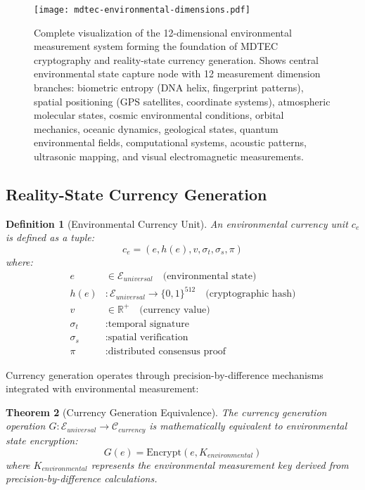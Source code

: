 \documentclass[12pt,a4paper]{article}
\newtheorem{theorem}{Theorem}
\newtheorem{definition}[theorem]{Definition}
\begin{document}
\begin{figure}[H]
\centering
\texttt{[image: mdtec-environmental-dimensions.pdf]}
\caption{Complete visualization of the 12-dimensional environmental measurement system forming the foundation of MDTEC cryptography and reality-state currency generation. Shows central environmental state capture node with 12 measurement dimension branches: biometric entropy (DNA helix, fingerprint patterns), spatial positioning (GPS satellites, coordinate systems), atmospheric molecular states, cosmic environmental conditions, orbital mechanics, oceanic dynamics, geological states, quantum environmental fields, computational systems, acoustic patterns, ultrasonic mapping, and visual electromagnetic measurements.}
\label{fig:environmental_dimensions}
\end{figure}

\subsection{Reality-State Currency Generation}

\begin{definition}[Environmental Currency Unit]
An environmental currency unit $c_e$ is defined as a tuple:
\begin{equation}
c_e = (e, h(e), v, \sigma_t, \sigma_s, \pi)
\end{equation}
where:
\begin{align}
e &\in \mathcal{E}_{universal} \quad \text{(environmental state)} \\
h(e) &: \mathcal{E}_{universal} \to \{0,1\}^{512} \quad \text{(cryptographic hash)} \\
v &\in \mathbb{R}^+ \quad \text{(currency value)} \\
\sigma_t &: \text{temporal signature} \\
\sigma_s &: \text{spatial verification} \\
\pi &: \text{distributed consensus proof}
\end{align}
\end{definition}

Currency generation operates through precision-by-difference mechanisms integrated with environmental measurement:

\begin{theorem}[Currency Generation Equivalence]
The currency generation operation $G: \mathcal{E}_{universal} \to \mathcal{C}_{currency}$ is mathematically equivalent to environmental state encryption:
\begin{equation}
G(e) = \text{Encrypt}(e, K_{environmental})
\end{equation}
where $K_{environmental}$ represents the environmental measurement key derived from precision-by-difference calculations.
\end{theorem}
\end{document}
